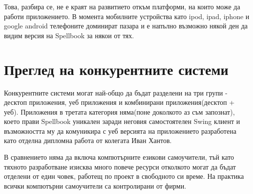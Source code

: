 Това, разбира се, не е краят на развитието откъм платформи, на които
може да работи приложението. В момента мобилните устройства като ipod,
ipad, iphone и google android телефоните доминират пазара и е напълно
възможно някой ден да видим версия на Spellbook за някои от тях.
\section{Преглед на конкурентните системи}
Конкурентните системи могат най-общо да бъдат разделени на три групи -
десктоп приложения, уеб приложения и комбинирани приложения(десктоп +
уеб). Приложения в третата категория няма(поне доколкото аз съм
запознат), което прави Spellbook уникален заради неговия самостоятелен
Swing клиент и възможността му да комуникира с уеб версията на
приложението разработена като отделна дипломна работа от колегата Иван
Хантов. 

В сравнението няма да включа компютърните езикови самоучители, тъй
като тяхното разработване изисква много повече ресурси отколкото могат
да бъдат отделени от един човек, работещ по проект в свободното си
време. На практика всички компютърни самоучители са контролирани от
фирми. 

